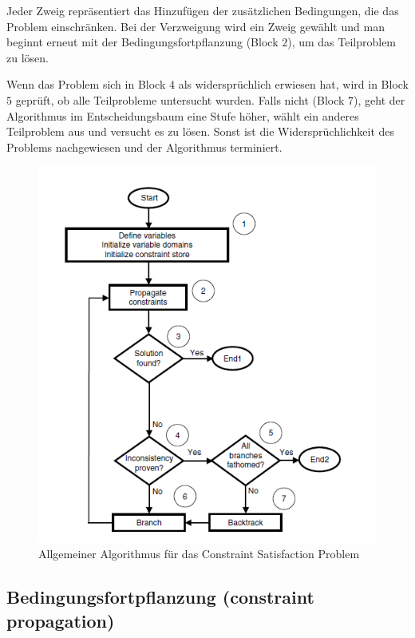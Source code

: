 Jeder Zweig repräsentiert das Hinzufügen der zusätzlichen Bedingungen, die das Problem einschränken. Bei der Verzweigung wird ein Zweig gewählt und man beginnt erneut mit der Bedingungsfortpflanzung (Block $2$), um das Teilproblem zu lösen.

Wenn das Problem sich in Block $4$ als widersprüchlich erwiesen hat, wird in Block $5$ geprüft, ob alle Teilprobleme untersucht wurden. Falls nicht (Block $7$), geht der Algorithmus im Entscheidungsbaum eine Stufe höher, wählt ein anderes Teilproblem aus und versucht es zu lösen. Sonst ist die Widersprüchlichkeit des Problems nachgewiesen und der Algorithmus terminiert.

\begin{figure}[h]
	\centering
	\includegraphics[scale=0.9]{fig/CSPalgorithm.png}
	\caption[Allgemeiner Algorithmus für das Constraint Satisfaction Problem]{Allgemeiner Algorithmus für das Constraint Satisfaction Problem \citep[aus][]{CPforScheduling}}
	\label{fig:CSPalgorithm}
\end{figure}

\FloatBarrier

\subsection{Bedingungsfortpflanzung (constraint propagation)}

